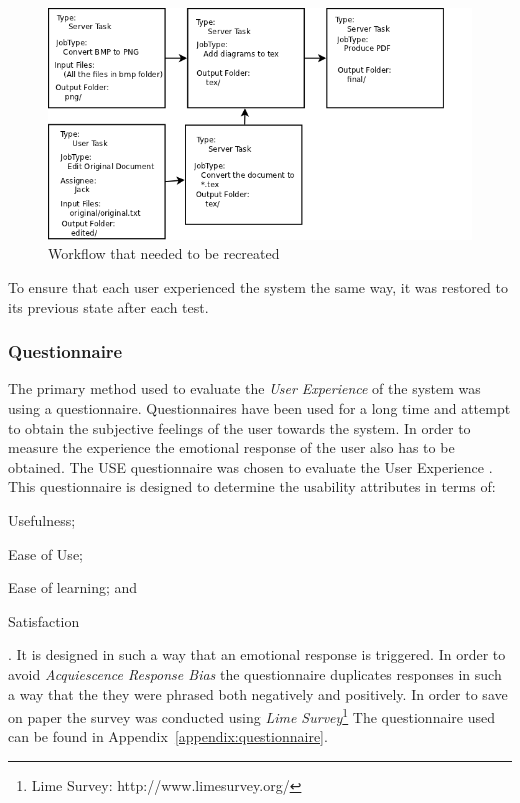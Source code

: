 \documentclass[12pt,a4paper]{report}
\begin{document}
\begin{figure}[!h]
    \begin{center}
        \includegraphics[scale=0.45]{figures/workflow.png}
    \end{center}
    \caption{Workflow that needed to be recreated}
    \label{eval:workflow}
\end{figure}
To ensure that each user experienced the system the same way, it was restored to
its previous state after each test.

\subsubsection{Questionnaire}
The primary method used to evaluate the \emph{User Experience} of the system was
using a questionnaire. Questionnaires have been used for a long time and attempt
to obtain the subjective feelings of the user towards the
system\cite{Chin:1988:DIM:57167.57203}. In order to measure the experience the
emotional response of the user also has to be obtained. The USE questionnaire
was chosen to evaluate the User Experience \cite{lund2001measuring}. This
questionnaire is designed to determine the usability attributes in terms of:
\begin{inparaenum}[(i)]\item Usefulness;\item Ease of Use; \item Ease of learning; and \item
Satisfaction \end{inparaenum}. It is designed in such a way that an
emotional response is triggered. In order to avoid \emph{Acquiescence Response Bias}
the questionnaire duplicates responses in such a way that the they were
phrased both negatively and positively.
In order to save on paper the survey was conducted using \emph{Lime
Survey}\footnote{Lime Survey: http://www.limesurvey.org/}
The questionnaire used can be found in Appendix~\ref{appendix:questionnaire}.
\end{document}
